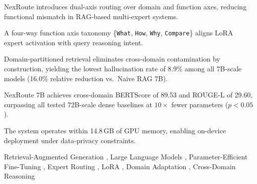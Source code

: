 \documentclass[a4paper,fleql]{cas-sc}
\begin{document}
\begin{abstract}
Existing RAG-based expert systems route queries by domain identity alone,
ignoring the reasoning function required to process them. This functional
mismatch leads to cross-domain contamination and increased hallucination
under unified retrieval.
We propose \textbf{NexRoute}, a dual-axis routing framework that decomposes
each query along two orthogonal dimensions: a domain axis
(\texttt{LAW}, \texttt{MED}, \texttt{SOC}, \texttt{STEM}, \texttt{CROSS})
and a function axis (\texttt{What}, \texttt{How}, \texttt{Why},
\texttt{Compare}). Their intersection---the \textit{nexus point}---selects
the appropriate LoRA-based expert and applies a function-specific retrieval
scaffold, jointly addressing cross-domain contamination and functional
mismatch.
Trained on 15,744 dual-annotated MMLU samples, NexRoute 7B achieves
\textbf{87.4\%} routing accuracy (+2.2~pp over the strongest baseline),
a cross-domain BERTScore of \textbf{89.53} and ROUGE-L of \textbf{29.60}
($p < 0.05$, paired $t$-test on 500 samples)---both surpassing all
72B-scale dense baselines---and the lowest hallucination rate of
\textbf{8.9\%} among all 7B-scale models. These results demonstrate that
joint domain-function alignment is a significant driver of cross-domain
generation quality, independently of parameter scale.
\end{abstract}
\begin{highlights}
    \item NexRoute introduces dual-axis routing over domain and function
    axes, reducing functional mismatch in RAG-based multi-expert systems.
    \item A four-way function axis taxonomy \{\texttt{What}, \texttt{How},
    \texttt{Why}, \texttt{Compare}\} aligns LoRA expert activation with
    query reasoning intent.
    \item Domain-partitioned retrieval eliminates cross-domain contamination
    by construction, yielding the lowest hallucination rate of 8.9\% among
    all 7B-scale models (16.0\% relative reduction vs.\ Naive RAG 7B).
    \item NexRoute 7B achieves cross-domain BERTScore of 89.53 and
    ROUGE-L of 29.60, surpassing all tested 72B-scale dense baselines at
    $10\times$ fewer parameters ($p < 0.05$).
    \item The system operates within 14.8\,GB of GPU memory, enabling
    on-device deployment under data-privacy constraints.
\end{highlights}
\begin{keywords}
Retrieval-Augmented Generation \sep
Large Language Models \sep
Parameter-Efficient Fine-Tuning \sep
Expert Routing \sep
LoRA \sep
Domain Adaptation \sep
Cross-Domain Reasoning
\end{keywords}
\maketitle
\end{document}
